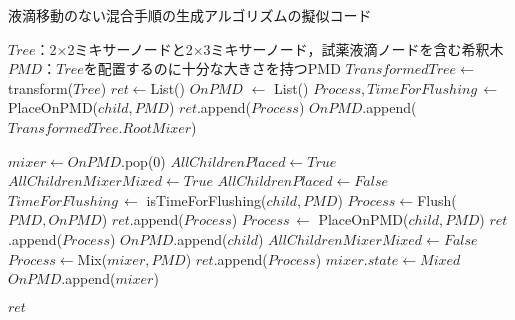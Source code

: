 \begin{algorithm}[tbp]
 \caption{液滴移動のない混合手順の生成アルゴリズムの擬似コード}\label{alg:prop}
 \begin{algorithmic}[1]
     \Require $\mathit{Tree}$：2$\times$2ミキサーノードと2$\times$3ミキサーノード，試薬液滴ノードを含む希釈木 
     \Require $\mathit{PMD}$：$\mathit{Tree}$を配置するのに十分な大きさを持つPMD  
     \State $\mathit{TransformedTree} \gets$ transform($Tree$) \label{transform_pseudo} \State $\mathit{ret} \gets $List() \label{xntm_pseudo}
     \State $\mathit{OnPMD}$ $\gets$ List() \label{xntm}
     \State $\mathit{Process,TimeForFlushing}\,\gets $  PlaceOnPMD($\mathit{child,PMD}$)
     \State $\mathit{ret}$.append($\mathit{Process}$)
     \State $\mathit{OnPMD}$.append($TransformedTree.RootMixer$)
    
    \State {}
        \State$\mathit{mixer} \gets  \mathit{OnPMD}$.pop(0)
        \State $\mathit{AllChildrenPlaced}\gets\mathit{True}$
        \State $\mathit{AllChildrenMixerMixed}\gets\mathit{True}$
                \State$\mathit{AllChildrenPlaced \gets False}$
                \State $\mathit{TimeForFlushing}\, \gets$  isTimeForFlushing($\mathit{child,PMD}$) 
                    \State $\mathit{Process}\gets$Flush($\mathit{PMD,OnPMD}$)
                    \State $\mathit{ret}$.append($\mathit{Process}$)
                \EndIf
                \State $\mathit{Process}\, \gets$  PlaceOnPMD($\mathit{child,PMD}$)
                \State $\mathit{ret}$.append($\mathit{Process}$)
                \State $\mathit{OnPMD}$.append($\mathit{child}$) 
            \EndIf 
                \State $\mathit{AllChildrenMixerMixed}\gets\mathit{False}$
            \EndIf 
        \EndFor 
            \State$\mathit{Process}\gets$Mix($\mathit{mixer,PMD}$)
            \State $\mathit{ret}$.append($\mathit{Process}$)
            \State$\mathit{mixer.state} \gets \mathit{Mixed}$ 
        \EndIf
        \State$\mathit{OnPMD}$.append($\mathit{mixer}$)
    \EndWhile 

     \Return $\mathit{ret}$
 \end{algorithmic}
\end{algorithm}





